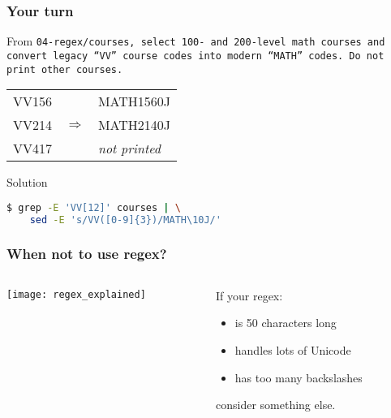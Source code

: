 \begin{frame}[fragile]
    \frametitle{Your turn}
    From \tt{04-regex/courses}, select 100- and 200-level math courses and convert
    legacy ``VV'' course codes into modern ``MATH'' codes.
    Do not print other courses.
    \begin{example}
        \begin{tabular}{lcl}
            VV156 &                   & MATH1560J            \\
            VV214 & $\Longrightarrow$ & MATH2140J            \\
            VV417 &                   & \textit{not printed}
        \end{tabular}
    \end{example}
    \pause
    \begin{block}{Solution}
        \begin{lstlisting}[language=bash]
$ grep -E 'VV[12]' courses | \
    sed -E 's/VV([0-9]{3})/MATH\10J/'
\end{lstlisting}
    \end{block}
\end{frame}

\begin{frame}
    \frametitle{When not to use regex?}
    \begin{columns}
        \begin{column}{0.7\textwidth}
            \texttt{[image: regex\_explained]}
        \end{column}
        \begin{column}{0.3\textwidth}
            If your regex:
            \begin{itemize}
                \item is 50 characters long
                \item handles lots of Unicode
                \item has too many backslashes
            \end{itemize}
            consider something else.
        \end{column}
    \end{columns}
\end{frame}

